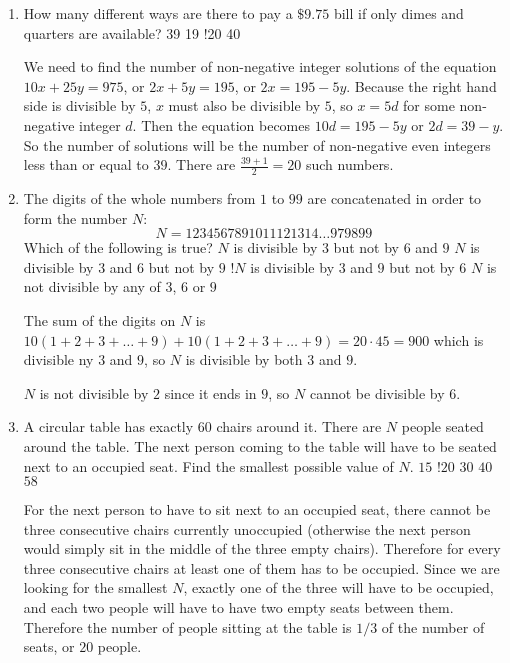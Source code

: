 \documentclass{article}
\begin{document}
\begin{enumerate}
   \item How many different ways are there to pay a $\$9.75$ bill if only
 dimes and quarters are available?
 \MultChoiceNOTA%
 {39}
 {19}
 {!20}%
 {40}
 \begin{solution}
    We need to find the number of non-negative integer solutions of the
    equation $10x + 25y = 975$, or $2x + 5y = 195$, or $2x = 195 - 5y$.
    Because the right hand side is divisible by $5$, $x$ must also be
    divisible by $5$, so $x=5d$ for some non-negative integer $d$. Then
    the equation becomes $10d = 195 - 5y$ or $2d = 39 - y$. So the number
    of solutions will be the number of non-negative even integers less
    than or equal to $39$.  There are $\frac{39+1}{2} = 20$ such numbers.
 \end{solution}
   \item The digits of the whole numbers from $1$ to $99$ are concatenated in
 order to form the number $N$:
 \[N = 1234567891011121314\dots979899\]
 Which of the following is true?
 \MultChoiceNOTA%
 {$N$ is divisible by $3$ but not by $6$ and $9$}
 {$N$ is divisible by $3$ and $6$ but not by $9$}
 {!$N$ is divisible by $3$ and $9$ but not by $6$}
 {$N$ is not divisible by any of $3$, $6$ or $9$}
 \begin{solution}
    The sum of the digits on $N$ is $10(1 + 2 + 3 + \dots + 9) + 10(1 + 2 +
    3 + \dots + 9) = 20\cdot 45 = 900$ which is
    divisible ny $3$ and $9$, so $N$ is divisible by both $3$ and $9$.

    $N$ is not divisible by $2$ since it ends in $9$, so $N$ cannot be
    divisible by $6$.
 \end{solution}
   \item A circular table has exactly $60$ chairs around it.  There are $N$
 people seated around the table.  The next person coming to the table will
 have to be seated next to an occupied seat.  Find the smallest possible
 value of $N$.
 \MultChoice%
 {$15$}
 {!$20$}
 {$30$}
 {$40$}
 {$58$}
 \begin{solution}
    For the next person to have to sit next to an occupied seat, there
    cannot be three consecutive chairs currently unoccupied (otherwise
    the next person would simply sit in the middle of the three empty
    chairs).  Therefore for every three consecutive chairs at least one of them
    has to be occupied. Since we are looking for the smallest $N$,
    exactly one of the three will have to be occupied, and each two
    people will have to have two empty seats between them.  Therefore the
    number of people sitting at the table is $1/3$ of the number of
    seats, or $20$ people. 
 \end{solution}
\end{enumerate}
\end{document}
